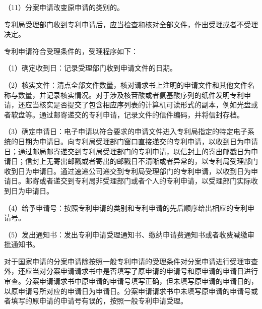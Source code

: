 {\setlength{\parindent}{17.1bp}（11）分案申请改变原申请的类别的。\par}

专利局受理部门收到专利申请后，应当检查和核对全部文件，作出受理或者不受理决定。

专利申请符合受理条件的，受理程序如下：

{\setlength{\parindent}{17.1bp}（1）确定收到日：记录受理部门收到申请文件的日期。\par}

{\setlength{\parindent}{17.1bp}（2）核实文件：清点全部文件数量，核对请求书上注明的申请文件和其他文件名称与数量，并记录核实情况。对于涉及核苷酸或者氨基酸序列的纸件发明专利申请，还应当核实是否提交了包含相应序列表的计算机可读形式的副本，例如光盘或者软盘等。通过邮寄递交的专利申请，记录文件的信件编码，并将信封存档。\par}

{\setlength{\parindent}{17.1bp}（3）确定申请日：电子申请以符合要求的申请文件进入专利局指定的特定电子系统的日期为申请日。向专利局受理部门窗口直接递交的专利申请，以收到日为申请日；通过邮局邮寄递交到专利局受理部门的专利申请，以信封上的寄出邮戳日为申请日；信封上无寄出邮戳或者寄出的邮戳日不清晰或者异常的，以专利局受理部门收到日为申请日。通过速递公司递交到专利局受理部门的专利申请，以收到日为申请日。邮寄或者递交到专利局非受理部门或者个人的专利申请，以受理部门实际收到日为申请日。\par}

{\setlength{\parindent}{17.1bp}（4）给予申请号：按照专利申请的类别和专利申请的先后顺序给出相应的专利申请号。\par}

{\setlength{\parindent}{17.1bp}（5）发出通知书：发出专利申请受理通知书、缴纳申请费通知书或者收费减缴审批通知书。\par}

对于国家申请的分案申请除按照一般专利申请的受理条件对分案申请进行受理审查外，还应当对分案申请请求书中是否填写了原申请的申请号和原申请的申请日进行审查。分案申请请求书中原申请的申请号填写正确，但未填写原申请的申请日的，以原申请号所对应的申请日为申请日。分案申请请求书中未填写原申请的申请号或者填写的原申请的申请号有误的，按照一般专利申请受理。

